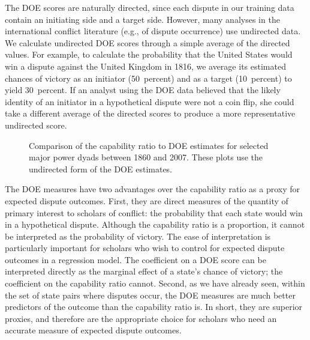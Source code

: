The DOE scores are naturally directed, since each dispute in our training data contain an initiating side and a target side.
However, many analyses in the international conflict literature (e.g., of dispute occurrence) use undirected data.
We calculate undirected DOE scores through a simple average of the directed values.
For example, to calculate the probability that the United States would win a dispute against the United Kingdom in 1816, we average its estimated chances of victory as an initiator (50~percent) and as a target (10~percent) to yield 30~percent.
If an analyst using the DOE data believed that the likely identity of an initiator in a hypothetical dispute were not a coin flip, she could take a different average of the directed scores to produce a more representative undirected score.

\begin{figure}[tp]
  \centering
  
  \vspace{-2em}
  \caption{
    Comparison of the capability ratio to DOE estimates for selected major power dyads between 1860 and 2007.
    These plots use the undirected form of the DOE estimates.
  }
  \label{fig:vs}
\end{figure}

The DOE measures have two advantages over the capability ratio as a proxy for expected dispute outcomes.
First, they are direct measures of the quantity of primary interest to scholars of conflict: the probability that each state would win in a hypothetical dispute.
Although the capability ratio is a proportion, it cannot be interpreted as the probability of victory.
The ease of interpretation is particularly important for scholars who wish to control for expected dispute outcomes in a regression model.
The coefficient on a DOE score can be interpreted directly as the marginal effect of a state's chance of victory; the coefficient on the capability ratio cannot.
Second, as we have already seen, within the set of state pairs where disputes occur, the DOE measures are much better predictors of the outcome than the capability ratio is.
In short, they are superior proxies, and therefore are the appropriate choice for scholars who need an accurate measure of expected dispute outcomes.


